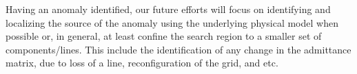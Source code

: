 \documentclass[twocolumn]{IEEEtran}
\newcommand{\mup}{\mu \text{PMU}}
\begin{document}
Having an anomaly identified, our future efforts will focus on identifying and localizing the source of the anomaly using the underlying physical model when possible or, in general, at least confine the search region to a smaller set of components/lines. This include the identification of any change in the admittance matrix, due to loss of a line, reconfiguration of the grid, and etc.    

% 

\vspace{-0.1cm}

\end{document}
